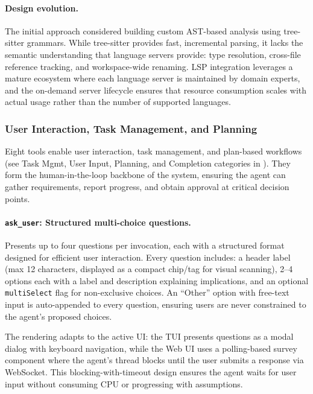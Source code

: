 \paragraph{Design evolution.} The initial approach considered building custom AST-based analysis using tree-sitter grammars. While tree-sitter provides fast, incremental parsing, it lacks the semantic understanding that language servers provide: type resolution, cross-file reference tracking, and workspace-wide renaming. LSP integration leverages a mature ecosystem where each language server is maintained by domain experts, and the on-demand server lifecycle ensures that resource consumption scales with actual usage rather than the number of supported languages.

\subsubsection{User Interaction, Task Management, and Planning}
\label{sec:interaction_tools}

Eight tools enable user interaction, task management, and plan-based workflows (see Task Mgmt, User Input, Planning, and Completion categories in ). They form the human-in-the-loop backbone of the system, ensuring the agent can gather requirements, report progress, and obtain approval at critical decision points.

\paragraph{\texttt{ask\_user}: Structured multi-choice questions.} Presents up to four questions per invocation, each with a structured format designed for efficient user interaction. Every question includes: a header label (max 12 characters, displayed as a compact chip/tag for visual scanning), 2--4 options each with a label and description explaining implications, and an optional \texttt{multiSelect} flag for non-exclusive choices. An ``Other'' option with free-text input is auto-appended to every question, ensuring users are never constrained to the agent's proposed choices.

The rendering adapts to the active UI: the TUI presents questions as a modal dialog with keyboard navigation, while the Web UI uses a polling-based survey component where the agent's thread blocks until the user submits a response via WebSocket. This blocking-with-timeout design ensures the agent waits for user input without consuming CPU or progressing with assumptions.

